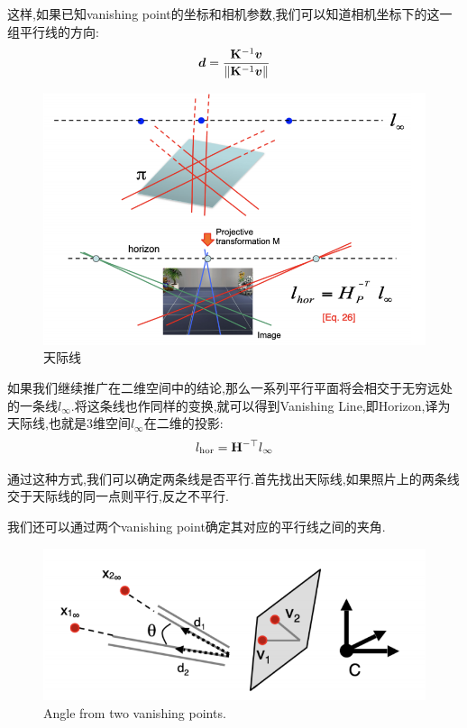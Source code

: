 这样,如果已知vanishing point的坐标和相机参数,我们可以知道相机坐标下的这一组平行线的方向:
\begin{equation}
	\bm d = \frac{\bold{K}^{-1} \bm v}{\left \Vert \bold{K}^{-1} \bm v \right \Vert}
\end{equation}






\begin{figure}
	\includegraphics[scale=0.35]{figures/horizon.png}
	\caption{天际线}
\end{figure}

如果我们继续推广在二维空间中的结论,那么一系列平行平面将会相交于无穷远处的一条线$l_\infty$.将这条线也作同样的变换,就可以得到Vanishing Line,即Horizon,译为天际线,也就是3维空间$l_\infty$在二维的投影:
\begin{equation}
	l_{\text{hor}} = \bold{H}^{-\top} l_{\infty}
\end{equation}


通过这种方式,我们可以确定两条线是否平行.首先找出天际线,如果照片上的两条线交于天际线的同一点则平行,反之不平行.

我们还可以通过两个vanishing point确定其对应的平行线之间的夹角.

\begin{figure}
	\includegraphics[scale=0.4]{figures/angle_between_line.png}
	\caption{Angle from two vanishing points.}
\end{figure}

